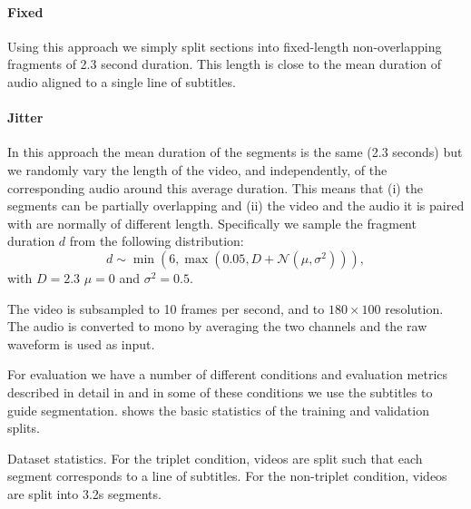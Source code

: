 \paragraph{Fixed} Using this approach we simply split sections into
fixed-length non-overlapping fragments of 2.3 second duration. This
length is close to the mean duration of audio aligned to a single line
of subtitles.

\paragraph{Jitter} In this approach the mean duration of the segments
is the same (2.3 seconds) but we randomly vary the length of the
video, and independently, of the corresponding audio around this
average duration. This means that (i) the segments can be partially
overlapping and (ii) the video and the audio it is paired with are
normally of different length. Specifically we sample the fragment duration $d$
from the following distribution:
\begin{dmath}
  d \sim \min(6, \max(0.05, D + \mathcal{N}(\mu, \sigma^2))),
\end{dmath}
with $D=2.3$ $\mu=0$ and $\sigma^2=0.5$.
\vskip 0.5cm

The video is subsampled to 10 frames per second, and to
$180\times 100$ resolution. The audio is converted to mono by
averaging the two channels and the raw waveform is used as input.

For evaluation we have a number of different conditions and evaluation
metrics described in detail in  and in some of these
conditions we use the subtitles to guide
segmentation.  shows the basic statistics of the
training and validation splits.

\begin{table}[htb]
  \centering
  
  \caption{Dataset statistics. For the triplet condition, videos are
    split such that each segment corresponds to a line of
    subtitles. For the non-triplet condition, videos are split into
    3.2s segments.}
  \label{tab:ds-stat}
\end{table}


